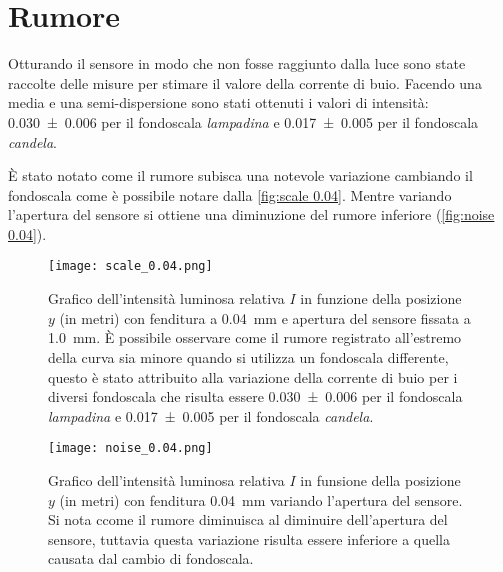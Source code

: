 \documentclass[../main.tex]{subfiles}
\begin{document}
\section{Rumore}

Otturando il sensore in modo che non fosse raggiunto dalla luce sono state raccolte delle misure per stimare il valore della corrente di buio. Facendo una media e una semi-dispersione sono stati ottenuti i valori di intensità: \num{0.030+-0.006} per il fondoscala \textit{lampadina} e \num{0.017+-0.005} per il fondoscala \textit{candela}.

È stato notato come il rumore subisca una notevole variazione cambiando il fondoscala come è possibile notare dalla \autoref{fig:scale 0.04}. Mentre variando l'apertura del sensore si ottiene una diminuzione del rumore inferiore (\autoref{fig:noise 0.04}).

\begin{figure}[ht!]
    \centering
    \texttt{[image: scale\_0.04.png]}
    \caption{Grafico dell'intensità luminosa relativa $I$ in funzione della posizione $y$ (in metri) con fenditura a \qty{0.04}{\mm} e apertura del sensore fissata a \qty{1.0}{\mm}. È possibile osservare come il rumore registrato all'estremo della curva sia minore quando si utilizza un fondoscala differente, questo è stato attribuito alla variazione della corrente di buio per i diversi fondoscala che risulta essere \num{0.030+-0.006} per il fondoscala \textit{lampadina} e \num{0.017+-0.005} per il fondoscala \textit{candela}.} %
    \label{fig:scale 0.04}
\end{figure}

\begin{figure}[ht!]
    \texttt{[image: noise\_0.04.png]}
    \caption{Grafico dell'intensità luminosa relativa $I$  in funsione della posizione $y$ (in metri) con fenditura \qty{0.04}{\mm} variando l'apertura del sensore. Si nota ccome il rumore diminuisca al diminuire dell'apertura del sensore, tuttavia questa variazione risulta essere inferiore a quella causata dal cambio di fondoscala.}
    \label{fig:noise 0.04}
\end{figure}
\end{document}
